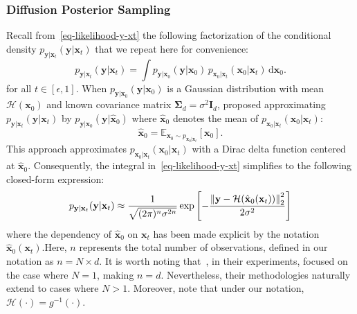 \subsubsection{Diffusion Posterior Sampling}
\label{app-dps}
Recall from~\eqref{eq-likelihood-y-xt} the following factorization of the conditional density $p_{\mathbf{y}|\mathbf{x}_t}(\mathbf{y}|\mathbf{x}_t)$ that we repeat here for convenience:
\begin{equation*}
    p_{\mathbf{y}|\mathbf{x}_t}(\mathbf{y}|\mathbf{x}_t) 
    = \int p_{\mathbf{y}|\mathbf{x}_0}(\mathbf{y}|\mathbf{x}_0) \, p_{\mathbf{x}_0|\mathbf{x}_t}(\mathbf{x}_0|\mathbf{x}_t) \, \mathrm{d}\mathbf{x}_0.
\end{equation*}
for all $t\in[\epsilon,1]$.
When $p_{\mathbf{y}|\mathbf{x}_0}(\mathbf{y}|\mathbf{x}_0)$ is a Gaussian distribution with mean $\mathcal{H}(\mathbf{x}_0)$ and known covariance matrix $\boldsymbol{\Sigma}_{d} = \sigma^2 \mathbf{I}_{d}$, \citet{chung2023} proposed approximating $p_{\mathbf{y}|\mathbf{x}_t}(\mathbf{y}|\mathbf{x}_t)$ by  $p_{\mathbf{y}|\mathbf{x}_0}(\mathbf{y}|\hat{\mathbf{x}}_0)$ where $\hat{\mathbf{x}}_0$ denotes the mean of $p_{\mathbf{x}_0|\mathbf{x}_t}(\mathbf{x}_0|\mathbf{x}_t)$:
\begin{equation*}
\hat{\mathbf{x}}_0= \mathbb{E}_{\mathbf{x}_0 \sim p_{\mathbf{x}_0|\mathbf{x}_t}}[\mathbf{x}_0]. 
\end{equation*}
This approach approximates $p_{\mathbf{x}_0|\mathbf{x}_t}(\mathbf{x}_0|\mathbf{x}_t)$ with a Dirac delta function centered at $\hat{\mathbf{x}}_0$. Consequently, the integral in~\eqref{eq-likelihood-y-xt} simplifies to the following closed-form expression:
\begin{equation*}
p_{\mathbf{y}|\mathbf{x}_t}(\mathbf{y}|\mathbf{x}_t) \approx \frac{1}{\sqrt{(2\pi)^{n}\sigma^{2n}}}\exp\left[-\frac{\left\lVert \mathbf{y}-\mathcal{H}(\hat{\mathbf{x}}_{0} (\mathbf{x}_t) ) \right\rVert_2^{2}}{2\sigma^{2}}\right]
\end{equation*}
where the dependency of $\hat{\mathbf{x}}_{0}$ on $\mathbf{x}_t$ has been made explicit by the notation $\hat{\mathbf{x}}_{0} (\mathbf{x}_t)$.Here, $n$ represents the total number of observations, defined in our notation as $n=N \times d$. It is worth noting that~\citet{chung2023}, in their experiments, focused on the case where $N=1$, making $n=d$. Nevertheless, their methodologies naturally extend to cases where $N>1$. Moreover, note that under our notation, $\mathcal{H}(\cdot) = g^{-1}(\cdot)$.

